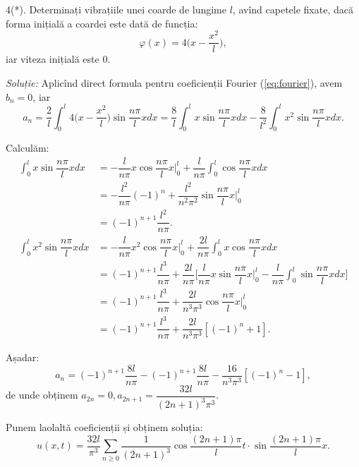 \vspace{1cm}

4(*). Determinați vibrațiile unei coarde de lungime $ l $, avînd capetele fixate,
dacă forma inițială a coardei este dată de funcția:
\[
  \varphi(x) = 4 \Big( x - \dfrac{x^2}{l} \Big),
\]
iar viteza inițială este $ 0 $.

\vspace{1cm}

\emph{Soluție:} Aplicînd direct formula pentru coeficienții Fourier (\ref{eq:fourier}),
avem $ b_n = 0 $, iar
\[
  a_n = \dfrac{2}{l} \int_0^l 4\Big( x - \dfrac{x^2}{l} \Big) \sin \dfrac{n\pi}{l} xdx = %
  \dfrac{8}{l} \int_0^l x \sin \dfrac{n\pi}{l} xdx - %
  \dfrac{8}{l^2} \int_0^l x^2 \sin \dfrac{n\pi}{l}xdx.
\]

Calculăm:
\begin{align*}
  \int_0^l x\sin \dfrac{n\pi}{l} xdx &= -\dfrac{l}{n\pi} x \cos \dfrac{n\pi}{l}x \Big|_0^l + %
                                      \dfrac{l}{n\pi} \int_0^l \cos \dfrac{n\pi}{l} xdx \\
                                    &= -\dfrac{l^2}{n\pi}(-1)^n + %
                                      \dfrac{l^2}{n^2 \pi^2} \sin\dfrac{n\pi}{l} x\Big|_0^l \\
                                    &= (-1)^{n + 1} \dfrac{l^2}{n\pi}. \\
  \int_0^l x^2 \sin \dfrac{n\pi}{l} xdx &= -\dfrac{l}{n\pi}x^2 \cos \dfrac{n\pi}{l}x \Big|_0^l + %
                                         \dfrac{2l}{n\pi}\int_0^l x\cos \dfrac{n\pi}{l} xdx \\
                                    &= (-1)^{n + 1} \dfrac{l^3}{n\pi} + %
                                      \dfrac{2l}{n\pi}\Big[ \dfrac{l}{n\pi} x\sin \dfrac{n\pi}{l}x\Big|_0^l - \dfrac{l}{n\pi}\int_0^l \sin \dfrac{n\pi}{l}xdx \Big] \\
                                    &= (-1)^{n + 1}\dfrac{l^3}{n\pi} + %
                                      \dfrac{2l}{n^3 \pi^3}\cos \dfrac{n\pi}{l}x\Big|_0^l \\
                                    &= (-1)^{n + 1} \dfrac{l^3}{n\pi} + \dfrac{2l}{n^3 \pi^3}[(-1)^n + 1].
\end{align*}

Așadar:
\[
  a_n = (-1)^{n + 1} \dfrac{8l}{n\pi} - (-1)^{n + 1}\dfrac{8l}{n\pi} - %
  \dfrac{16}{n^3 \pi^3}[(-1)^n - 1],
\]
de unde obținem $ a_{2n} = 0, a_{2n+1} = \dfrac{32l}{(2n + 1)^3 \pi^3} $.

Punem laolaltă coeficienții și obținem soluția:
\[
  u(x, t) = \dfrac{32l}{\pi^3} \sum_{n \geq 0} \dfrac{1}{(2n + 1)^3} \cos\dfrac{(2n + 1)\pi}{l} t %
  \cdot \sin\dfrac{(2n + 1)\pi}{l} x.
\]

